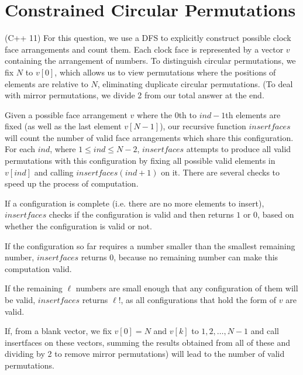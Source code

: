 \documentclass{article}
\begin{document}
\section{Constrained Circular Permutations}
(C++ 11) For this question, we use a DFS to explicitly construct possible clock face arrangements and count them. Each clock face is represented by a vector $v$ containing the arrangement of numbers. To distinguish circular permutations, we fix $N$ to $v[0]$, which allows us to view permutations where the positions of elements are relative to $N$, eliminating duplicate circular permutations. (To deal with mirror permutations, we divide 2 from our total answer at the end.
\par 
Given a possible face arrangement $v$ where the $0$th to $ind-1$th elements are fixed (as well as the last element $v[N-1]$), our recursive function $insertfaces$ will count the number of valid face arrangements which share this configuration. For each $ind$, where $1 \leq ind \leq N-2$, $insertfaces$ attempts to produce all valid permutations with this configuration by fixing all possible valid elements in $v[ind]$ and calling $insertfaces(ind+1)$ on it. There are several checks to speed up the process of computation.
\par 
If a configuration is complete (i.e. there are no more elements to insert), $insertfaces$ checks if the configuration is valid and then returns $1$ or $0$, based on whether the configuration is valid or not.
\par 
If the configuration so far requires a number smaller than the smallest remaining number, $insertfaces$ returns $0$, because no remaining number can make this computation valid.
\par 
If the remaining $\ell$ numbers are small enough that any configuration of them will be valid, $insertfaces$ returns $\ell !$, as all configurations that hold the form of $v$ are valid.
\par 
If, from a blank vector, we fix $v[0]=N$ and $v[k]$ to $1,2,\dots,N-1$ and call insertfaces on these vectors, summing the results obtained from all of these and dividing by 2 to remove mirror permutations) will lead to the number of valid permutations.
\end{document}
